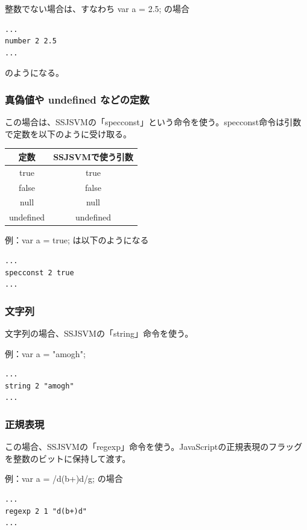 \documentclass[12pt]{article}
\begin{document}
整数でない場合は、すなわち var a = 2.5; の場合
\begin{lstlisting}
...
number 2 2.5
...
\end{lstlisting}
\FloatBarrier

のようになる。

\subsubsection{真偽値や undefined などの定数}
この場合は、SSJSVMの「specconst」という命令を使う。specconst命令は引数で定数を以下のように受け取る。\\

\begin{table}[h]
\centering
\begin{tabular}{|c|c|}
	\hline
	定数 & SSJSVMで使う引数 \\
	\hline
	true & true \\
	false & false \\
	null & null \\
	undefined & undefined \\
	\hline
\end{tabular}
\end{table}

例：var a = true; は以下のようになる\\

\begin{lstlisting}
...
specconst 2 true
...
\end{lstlisting}

\subsubsection{文字列}
文字列の場合、SSJSVMの「string」命令を使う。

例：var a = "amogh";\\

\begin{lstlisting}
...
string 2 "amogh"
...
\end{lstlisting}

\subsubsection{正規表現}
この場合、SSJSVMの「regexp」命令を使う。JavaScriptの正規表現のフラッグを整数のビットに保持して渡す。

例：var a = /d(b+)d/g; の場合\\

\begin{lstlisting}
...
regexp 2 1 "d(b+)d"
...
\end{lstlisting}
\end{document}
